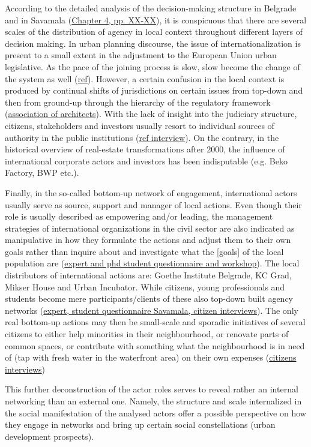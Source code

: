 \documentclass[11pt]{report}
\begin{document}
According to the detailed analysis of the decision-making structure in Belgrade and in Savamala (\href{}{Chapter 4, pp. XX-XX}), it is conspicuous that there are several scales of the distribution of agency in local context throughout different layers of decision making.
In urban planning discourse, the issue of internationalization is present to a small extent in the adjustment to the European Union urban legislative. As the pace of the joining process is slow, slow become the change of the system as well (\href{}{ref}). 
However, a certain confusion in the local context is produced by continual shifts of jurisdictions on certain issues from top-down and then from ground-up through the hierarchy of the regulatory framework (\href{}{association of architects}).
With the lack of insight into the judiciary structure, citizens, stakeholders and investors usually resort to individual sources of authority in the public institutions (\href{}{ref interview}).
On the contrary, in the historical overview of real-estate transformations after 2000, the influence of international corporate actors and investors has been indisputable (e.g. Beko Factory, BWP etc.).

Finally, in the so-called bottom-up network of engagement, international actors usually serve as source, support and manager of local actions.
Even though their role is usually described as empowering and/or leading, the management strategies of international organizations in the civil sector are also indicated as manipulative in how they formulate the actions and adjust them to their own goals rather than inquire about and investigate what the [goals] of the local  population are (\href{}{expert and phd student questionnaire and workshop}).
The local distributors of international actions are: Goethe Institute Belgrade, KC Grad, Mikser House and Urban Incubator.
While citizens, young professionals and students become mere participants/clients of these also top-down built agency networks (\href{}{expert, student questionnaire Savamala, citizen interviews}).
The only real bottom-up actions may then be small-scale and sporadic initiatives of several citizens to either help minorities in their neighbourhood, or renovate parts of common spaces, or contribute with something what the neighbourhood is in need of (tap with fresh water in the waterfront area) on their own expenses (\href{}{citizens interviews})

This further deconstruction of the actor roles serves to reveal rather an internal networking than an external one. Namely, the structure and scale internalized in the social manifestation of the analysed actors offer a possible perspective on how they engage in networks and bring up certain social constellations (urban development prospects).
\end{document}
